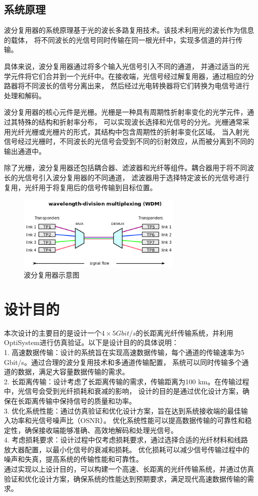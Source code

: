 \documentclass[12pt, a4paper, oneside]{article}
\begin{document}
\begin{spacing}{2.0}
\subsection{系统原理}
波分复用器的系统原理基于光的波长多路复用技术。该技术利用光的波长作为信息的载体，
将不同波长的光信号同时传输在同一根光纤中，实现多信道的并行传输。

具体来说，波分复用器通过将多个输入光信号引入不同的通道，
并通过适当的光学元件将它们合并到一个光纤中。在接收端，光信号经过解复用器，通过相应的分路器将不同波长的信号分离出来，
然后经过光电转换器将它们转换为电信号进行处理和解码。

波分复用器的核心元件是光栅。光栅是一种具有周期性折射率变化的光学元件，通过其特殊的结构和折射率分布，
可以实现波长选择和光信号的分光。光栅通常采用光纤光栅或光栅片的形式，其结构中包含周期性的折射率变化区域。
当入射光信号经过光栅时，不同波长的光信号会受到不同的衍射效应，从而被分离到不同的输出通道中。

除了光栅，波分复用器还包括耦合器、滤波器和光纤等组件。耦合器用于将不同波长的光信号引入波分复用器的不同通道，
滤波器用于选择特定波长的光信号进行复用，光纤用于将复用后的信号传输到目标位置。
\begin{figure}[htbp]
	\centering
	\includegraphics[width=8cm]{figure1.png}
	\caption{波分复用器示意图}
\end{figure}
\clearpage
\section{设计目的}
本次设计的主要目的是设计一个$4\times 5 Gbit/s$的长距离光纤传输系统，并利用OptiSystem进行仿真验证。以下是设计目的的具体说明：\\
1.	高速数据传输：设计的系统旨在实现高速数据传输，每个通道的传输速率为5 Gbit/s。通过合理的波分复用技术和多通道传输配置，
系统可以同时传输多个通道的数据，满足大容量数据传输的需求。
\\
2.	长距离传输：设计考虑了长距离传输的需求，传输距离为100 km。在传输过程中，光信号会受到光纤损耗和衰减的影响，
设计的目的是通过优化设计方案，确保在长距离传输中保持信号的质量和功率。
\\
3.	优化系统性能：通过仿真验证和优化设计方案，旨在达到系统接收端的最佳输入功率和光信号噪声比（OSNR）。
优化系统性能可以提高数据传输的可靠性和稳定性，确保接收端能够准确、高效地解码和处理光信号。
\\
4.	考虑损耗要求：设计过程中仅考虑损耗要求，通过选择合适的光纤材料和线路放大器配置，以最小化信号的衰减和损耗。
优化损耗可以减少信号传输过程中的噪声和失真，提高系统的传输性能和可靠性。
\\
通过实现以上设计目的，可以构建一个高速、长距离的光纤传输系统，并通过仿真验证和优化设计方案，确保系统的性能达到预期要求，满足现代高速数据传输的需求。

\end{spacing}
\end{document}

